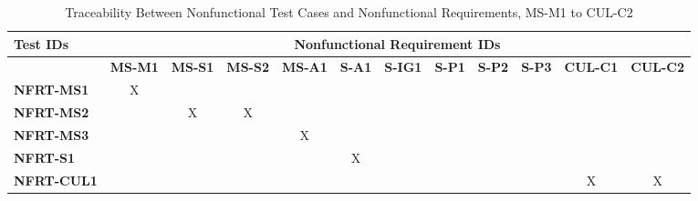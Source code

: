 \documentclass[12pt, titlepage]{article}
\begin{document}
\begin{landscape}
			\begin{longtable}{|l|ccccccccccc|}
	\caption{Traceability Between Nonfunctional Test Cases and Nonfunctional Requirements, MS-M1 to CUL-C2}                                                                                                                                                                                                                           \\
		\hline
		\textbf{Test IDs}   & \multicolumn{11}{c|}{\textbf{Nonfunctional Requirement IDs}}                                                                                                                                                                                                                 \\
		\hline
		~                   & \textbf{MS-M1}  & \textbf{MS-S1} & \textbf{MS-S2} & \textbf{MS-A1} & \textbf{S-A1} & \textbf{S-IG1} & \textbf{S-P1} & \textbf{S-P2} & \textbf{S-P3} & \textbf{CUL-C1} & \textbf{CUL-C2}\\
		\hline
		\textbf{NFRT-MS1} & X                                                         & ~             & ~             & ~             & ~             & ~             & ~             & ~             & ~             & ~             & ~ \\
		\textbf{NFRT-MS2} & ~                                                         & X             & X             & ~             & ~             & ~             & ~             & ~             & ~             & ~             & ~\\
		\textbf{NFRT-MS3} & ~                                                         & ~             & ~             & X             & ~             & ~             & ~             & ~             & ~             & ~             & ~\\
		\textbf{NFRT-S1} & ~                                                         & ~             & ~             & ~             & X             & ~             & ~             & ~             & ~             & ~             & ~ \\
		\textbf{NFRT-CUL1} & ~                                                         & ~             & ~             & ~             & ~             & ~             & ~             & ~             & ~             & X             & X\\
		\hline
	\end{longtable}

	\newpage
\end{landscape}
\end{document}
